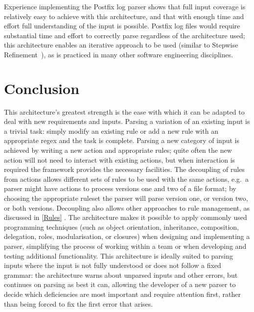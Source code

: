\documentclass{svmult}
\newcommand{\sectionref}[1]{%
    \textsection{}\vref*{#1}%
}
\begin{document}
Experience implementing the Postfix log parser shows that full input
coverage is relatively easy to achieve with this architecture, and that
with enough time and effort full understanding of the input is possible.
Postfix log files would require substantial time and effort to correctly
parse regardless of the architecture used; this architecture enables an
iterative approach to be used (similar to Stepwise
Refinement~\cite{stepwise-refinement}), as is practiced in many other
software engineering disciplines.

\section{Conclusion}

This architecture's greatest strength is the ease with which it can be
adapted to deal with new requirements and inputs.  Parsing a variation of
an existing input is a trivial task: simply modify an existing rule or add
a new rule with an appropriate regex and the task is complete.  Parsing a
new category of input is achieved by writing a new action and appropriate
rules; quite often the new action will not need to interact with existing
actions, but when interaction is required the framework provides the
necessary facilities.  The decoupling of rules from actions allows
different sets of rules to be used with the same actions, e.g.\ a parser
might have actions to process versions one and two of a file format; by
choosing the appropriate ruleset the parser will parse version one, or
version two, or both versions.  Decoupling also allows other approaches to
rule management, as discussed in \sectionref{Rules}.  The architecture
makes it possible to apply commonly used programming techniques (such as
object orientation, inheritance, composition, delegation, roles,
modularisation, or closures) when designing and implementing a parser,
simplifying the process of working within a team or when developing and
testing additional functionality.  This architecture is ideally suited to
parsing inputs where the input is not fully understood or does not follow a
fixed grammar: the architecture warns about unparsed inputs and other
errors, but continues on parsing as best it can, allowing the developer of
a new parser to decide which deficiencies are most important and require
attention first, rather than being forced to fix the first error that
arises.
\end{document}
